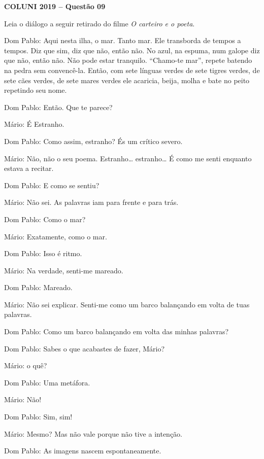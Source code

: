 \textbf{COLUNI 2019 -- Questão 09}\par\medskip Leia o diálogo a seguir retirado do filme \textit{O carteiro e o poeta}.

\par

Dom Pablo: Aqui nesta ilha, o mar. Tanto mar. Ele transborda de tempos a tempos. Diz que sim, diz que não, então não. No azul, na espuma, num galope diz que não, então não. Não pode estar tranquilo. “Chamo-te mar”, repete batendo na pedra sem convencê-la. Então, com sete línguas verdes de sete tigres verdes, de sete cães verdes, de sete mares verdes ele acaricia, beija, molha e bate no peito repetindo seu nome.\par
Dom Pablo: Então. Que te parece?\par
Mário: É Estranho.\par
Dom Pablo: Como assim, estranho? És um crítico severo.\par
Mário: Não, não o seu poema. Estranho… estranho… É como me senti enquanto estava a recitar.\par
Dom Pablo: E como se sentiu?\par
Mário: Não sei. As palavras iam para frente e para trás.\par
Dom Pablo: Como o mar?\par
Mário: Exatamente, como o mar.\par
Dom Pablo: Isso é ritmo.\par
Mário: Na verdade, senti-me mareado.\par
Dom Pablo: Mareado.\par
Mário: Não sei explicar. Senti-me como um barco balançando em volta de tuas palavras.\par
Dom Pablo: Como um barco balançando em volta das minhas palavras?\par
Dom Pablo: Sabes o que acabastes de fazer, Mário?\par
Mário: o quê?\par
Dom Pablo: Uma metáfora.\par
Mário: Não!\par
Dom Pablo: Sim, sim!\par
Mário: Mesmo? Mas não vale porque não tive a intenção.\par
Dom Pablo: As imagens nascem espontaneamente.

\par

